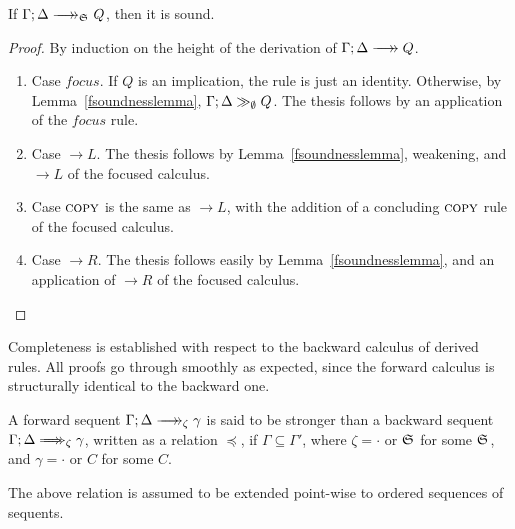 \begin{theorem}[Soundness]
  If $\zfneuseq{\Gamma}{\Delta}{\ctrlset{}}{Q}$, then it is sound.
\end{theorem}
\begin{proof}
  By induction on the height of the derivation of
  $\fneuseq{\Gamma}{\Delta}{Q}$.

  \begin{enumerate}
  \item Case $focus$.
    If $Q$ is an implication, the rule is just an identity. Otherwise, by
    Lemma~\ref{fsoundnesslemma}, $\Gamma; \Delta \gg_{\emptyset} Q$. The thesis
    follows by an application of the $focus$ rule.

  \item Case $\rightarrow L$.
    The thesis follows by Lemma~\ref{fsoundnesslemma}, weakening, and
    $\rightarrow L$ of the focused calculus.

  \item Case $\textsc{copy}$ is the same as $\rightarrow L$, with the addition of a
    concluding $\textsc{copy}$ rule of the focused calculus.

  \item Case $\rightarrow R$.
    The thesis follows easily by Lemma~\ref{fsoundnesslemma}, and an application
    of $\rightarrow R$ of the focused calculus.

  \end{enumerate}
\end{proof}

Completeness is established with respect to the backward calculus of derived
rules. All proofs go through smoothly as expected, since the forward calculus is
structurally identical to the backward one.

\begin{definition}
  A forward sequent $\zfneuseq{\Gamma}{\Delta}{\zeta}{\gamma}$ is said to be
  stronger than a backward sequent
  $\zbneuseq{\Gamma}{\Delta}{\zeta}{\gamma}$, written as a relation
  $\preceq$, if $\Gamma \subseteq \Gamma'$, where $\zeta = \cdot$ or
  $\mathfrak{S}_{}$ for some $\mathfrak{S}_{}$, and $\gamma = \cdot$ or $C$ for some $C$.
\end{definition}

The above relation is assumed to be extended point-wise to ordered sequences of
sequents.

